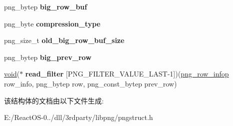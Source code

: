 \begin{DoxyCompactItemize}
\mbox{\label{structpng__struct__def_a7248deb9bb1525d1d16ee9d6187128b9}} 
png\+\_\+bytep {\bfseries big\+\_\+row\+\_\+buf}
\item 
\mbox{\label{structpng__struct__def_ad448c2648c447212ff66a0ec48cf1394}} 
png\+\_\+byte {\bfseries compression\+\_\+type}
\item 
\mbox{\label{structpng__struct__def_a42a732b3edf3c2fae816610beb949cc5}} 
png\+\_\+size\+\_\+t {\bfseries old\+\_\+big\+\_\+row\+\_\+buf\+\_\+size}
\item 
\mbox{\label{structpng__struct__def_a58ed983872249c948e063743eb18d427}} 
png\+\_\+bytep {\bfseries big\+\_\+prev\+\_\+row}
\item 
\mbox{\label{structpng__struct__def_a669016ed081452035d16f3a93740d663}} 
\hyperlink{interfacevoid}{void}($\ast$ {\bfseries read\+\_\+filter} \mbox{[}P\+N\+G\+\_\+\+F\+I\+L\+T\+E\+R\+\_\+\+V\+A\+L\+U\+E\+\_\+\+L\+A\+ST-\/1\mbox{]})(\hyperlink{structpng__row__info__struct}{png\+\_\+row\+\_\+infop} row\+\_\+info, png\+\_\+bytep row, png\+\_\+const\+\_\+bytep prev\+\_\+row)
\end{DoxyCompactItemize}


该结构体的文档由以下文件生成\+:\begin{DoxyCompactItemize}
\item 
E\+:/\+React\+O\+S-\/0../dll/3rdparty/libpng/pngstruct.\+h\end{DoxyCompactItemize}
